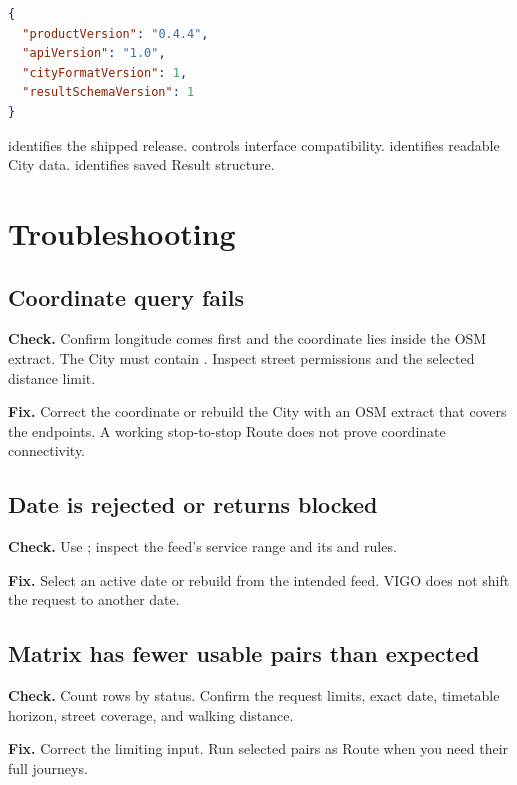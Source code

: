 \documentclass[10pt,letterpaper]{article}
\begin{document}
\begin{lstlisting}[language=json]
{
  "productVersion": "0.4.4",
  "apiVersion": "1.0",
  "cityFormatVersion": 1,
  "resultSchemaVersion": 1
}
\end{lstlisting}

 identifies the shipped release.  controls interface compatibility.  identifies readable City data.  identifies saved Result structure.

\section{Troubleshooting}

\subsection{Coordinate query fails}

\textbf{Check.} Confirm longitude comes first and the coordinate lies inside the OSM extract. The City must contain . Inspect street permissions and the selected distance limit.

\textbf{Fix.} Correct the coordinate or rebuild the City with an OSM extract that covers the endpoints. A working stop-to-stop Route does not prove coordinate connectivity.

\subsection{Date is rejected or returns blocked}

\textbf{Check.} Use ; inspect the feed's service range and its  and  rules.

\textbf{Fix.} Select an active date or rebuild from the intended feed. VIGO does not shift the request to another date.

\subsection{Matrix has fewer usable pairs than expected}

\textbf{Check.} Count rows by status. Confirm the request limits, exact date, timetable horizon, street coverage, and walking distance.

\textbf{Fix.} Correct the limiting input. Run selected pairs as Route when you need their full journeys.
\end{document}
